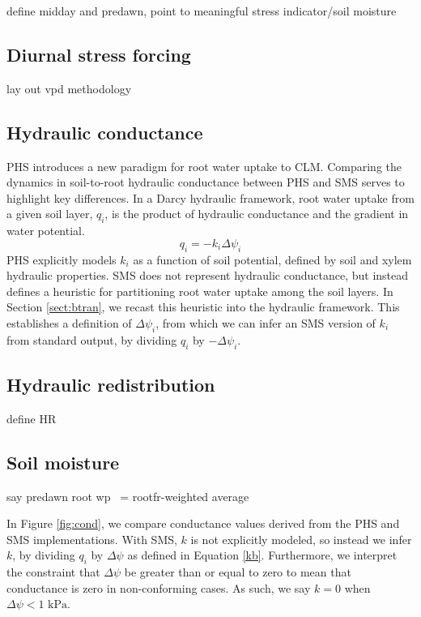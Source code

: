 \documentclass[draft,linenumbers]{agujournal}
\begin{document}
define midday and predawn, point to meaningful stress indicator/soil moisture

\subsection{Diurnal stress forcing}
lay out vpd methodology

\subsection{Hydraulic conductance}
PHS introduces a new paradigm for root water uptake to CLM.
Comparing the dynamics in soil-to-root hydraulic conductance between PHS and SMS serves to highlight key differences.
In a Darcy hydraulic framework, root water uptake from a given soil layer, $q_i$, is the product of hydraulic conductance and the gradient in water potential.
\begin{equation}
q_i = -k_i\Delta\psi_i
\end{equation}
PHS explicitly models $k_i$ as a function of soil potential, defined by soil and xylem hydraulic properties.
SMS does not represent hydraulic conductance, but instead defines a heuristic for partitioning root water uptake among the soil layers.
In Section \ref{sect:btran}, we recast this heuristic into the hydraulic framework.
This establishes a definition of $\Delta\psi_i$, from which we can infer an SMS version of $k_i$ from standard output, by dividing $q_i$ by $-\Delta\psi_i$.


\subsection{Hydraulic redistribution}
define HR

\subsection{Soil moisture}
say predawn root wp ~= rootfr-weighted average


    In Figure \ref{fig:cond}, we compare conductance values derived from the PHS and SMS implementations.
    With SMS, $k$ is not explicitly modeled, so instead we infer $k$, 
    by dividing $q_i$ by $\Delta\psi$ as defined in Equation \ref{kb}.
    Furthermore, we interpret the constraint that $\Delta\psi$ be greater than or equal to zero to mean 
    that conductance is zero in non-conforming cases. As such, we say $k=0$ when $\Delta\psi<\text{1 kPa}$.
    
\end{document}
